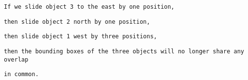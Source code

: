\begin{verbatim}

\end{verbatim}
\begin{verbatim}
If we slide object 3 to the east by one position, \end{verbatim}
\begin{verbatim}
then slide object 2 north by one position, \end{verbatim}
\begin{verbatim}
then slide object 1 west by three positions, \end{verbatim}
\begin{verbatim}
then the bounding boxes of the three objects will no longer share any overlap \end{verbatim}
\begin{verbatim}
in common.\end{verbatim}
